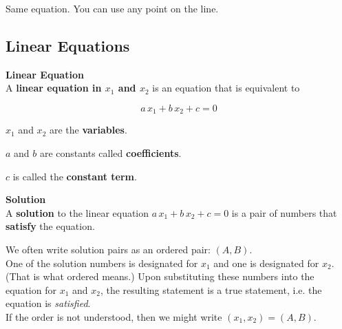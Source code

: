 \documentclass{ximera}
\begin{document}
Same equation.  You can use any point on the line.















\subsection*{Linear Equations}


\begin{definition} \textbf{\textcolor{green!50!black}{Linear Equation}} \\


A \textbf{linear equation in $x_1$ and $x_2$} is an equation that is equivalent to 

\[
a \, x_1 + b \, x_2 + c = 0
\]


$x_1$ and $x_2$ are the \textbf{variables}.

$a$ and $b$ are constants called \textbf{coefficients}.

$c$ is called the \textbf{constant term}.

\end{definition}










\begin{definition} \textbf{\textcolor{green!50!black}{Solution}} \\


A \textbf{solution} to the linear equation  $a \, x_1 + b \, x_2 + c = 0$ is a pair of numbers that \textbf{satisfy} the equation.


\end{definition}

\begin{notation}


We often write solution pairs as an ordered pair: $(A, B)$. \\


One of the solution numbers is designated for $x_1$ and one is designated for $x_2$.  (That is what ordered means.) Upon substituting these numbers into the equation for $x_1$ and $x_2$, the resulting statement is a true statement, i.e. the equation is \textit{satisfied}. \\

If the order is not understood, then we might write $(x_1, x_2) = (A, B)$.


\end{notation}
\end{document}
